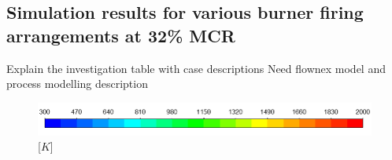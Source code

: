 \documentclass[review]{elsarticle}
\begin{document}
\subsection{Simulation results for various burner firing arrangements at 32\% MCR }


Explain the investigation
table with case descriptions
Need flownex model and process modelling description
\begin{figure}
\centering
\includegraphics[scale = 0.45]{TEMP_KEY} [$K$]\\
\\

\end{figure}
\end{document}
